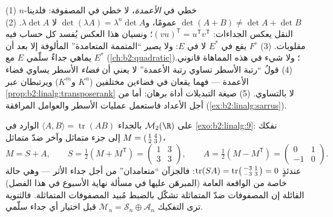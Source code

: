 \begin{remark}\label{rem:b2:linalg:pitfalls}
(1)  $n$-خطي في \emph{الأعمدة}، لا خطي في
المصفوفة: فلدينا $\det(A + B) \neq \det A + \det B$ عمومًا،
و$\det(\lambda A) = \lambda^n\det A$ لا $\lambda\det A$. (2) النقل يعكس الجداءات:
$(vu)^{\mathsf T} = u^{\mathsf T}v^{\mathsf T}$؛ ونسيان
هذا العكس يُفسد كل حساب فيه مقلوبات. (3) 
$F^\circ$ يقع في $E^*$ لا في $E$: ولا يصير ``المتممة
المتعامدة'' المألوفة إلا بعد أن يماهي جداءٌ سلّمي
$E$ مع $E^*$ (\cref{ch:b2:quadratic})؛ ولا شيء في
هذه المماهاة قانوني. (4) قولُ ``رتبة الأسطر تساوي رتبة
الأعمدة'' لا يعني أن \emph{فضاء} الأسطر يساوي فضاء الأعمدة ---
فهما يقعان في فضاءين مختلفين ($K^n$ و$K^m$) ويرتبطان
عبر \cref{prop:b2:linalg:transposerank} لا بالتساوي.
(5) صيغة التبديلات أداة برهان: أما من أجل الأعداد فاستعمل
عمليات الأسطر والعوامل المرافقة (\cref{ex:b2:linalg:sarrus}).
\end{remark}

\begin{example}\label{ex:b2:linalg:tracepairing}
على $\mathcal{M}_2(\R)$ بالجداء $\langle A, B\rangle =
\operatorname{tr}(AB)$ الوارد في \cref{exo:b2:linalg:9}: نفكك $M =
\begin{psmallmatrix}1 & 4\\ 2 & 3\end{psmallmatrix}$ إلى
جزء متماثل وآخر ضدّ متماثل،
\[
M = S + A, \qquad
S = \tfrac12(M + M^{\mathsf T}) =
\begin{pmatrix}1 & 3\\ 3 & 3\end{pmatrix},
\qquad
A = \tfrac12(M - M^{\mathsf T}) =
\begin{pmatrix}0 & 1\\ -1 & 0\end{pmatrix}.
\]
عندئذٍ $\operatorname{tr}(SA) = \operatorname{tr}
\begin{psmallmatrix}-3 & 1\\ -3 & 3\end{psmallmatrix} = 0$: فالجزآن
``متعامدان'' من أجل جداء الأثر --- وهي حالة خاصة من الواقعة
العامة (المبرهَن عليها في مسألة نهاية الأسبوع في هذا الفصل)
القائلة إن المصفوفات ضدّ المتماثلة تشكّل بالضبط مُبيد
المصفوفات المتماثلة. فالثنوية ترى التفكيك
$\mathcal{M}_n = \mathcal{S}_n \oplus
\mathcal{A}_n$ قبل اختيار أي جداء سلّمي.
\end{example}

